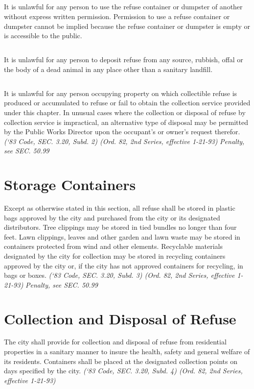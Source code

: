 \documentclass[code.tex]{subfiles}
\begin{document}
\subsection{}
It is unlawful for any person to use the refuse container or dumpster of another without express written permission.  Permission to use a refuse container or dumpster cannot be implied because the refuse container or dumpster is empty or is accessible to the public.
\subsection{}
It is unlawful for any person to deposit refuse from any source, rubbish, offal or the body of a dead animal in any place other than a sanitary landfill.
\subsection{}
It is unlawful for any person occupying property on which collectible refuse is produced or accumulated to refuse or fail to obtain the collection service provided under this chapter.  In unusual cases where the collection or disposal of refuse by collection service is impractical, an alternative type of disposal may be permitted by the Public Works Director upon the occupant’s or owner’s request therefor.\newline
\emph{(‘83 Code, SEC. 3.20, Subd. 2) (Ord. 82, 2nd Series, effective 1-21-93)}\newline
\emph{Penalty, see SEC. 50.99}
\section{Storage Containers}
Except as otherwise stated in this section, all refuse shall be stored in plastic bags approved by the city and purchased from the city or its designated distributors.  Tree clippings may be stored in tied bundles no longer than four feet.  Lawn clippings, leaves and other garden and lawn waste may be stored in containers protected from wind and other elements.  Recyclable materials designated by the city for collection may be stored in recycling containers approved by the city or, if the city has not approved containers for recycling, in bags or boxes.\newline
\emph{(‘83 Code, SEC. 3.20, Subd. 3) (Ord. 82, 2nd Series, effective 1-21-93)}\newline
\emph{Penalty, see SEC. 50.99}
\section{Collection and Disposal of Refuse}
The city shall provide for collection and disposal of refuse from residential properties in a sanitary manner to insure the health, safety and general welfare of its residents.  Containers shall be placed at the designated collection points on days specified by the city.\newline
\emph{(‘83 Code, SEC. 3.20, Subd. 4) (Ord. 82, 2nd Series, effective 1-21-93)}
\end{document}
